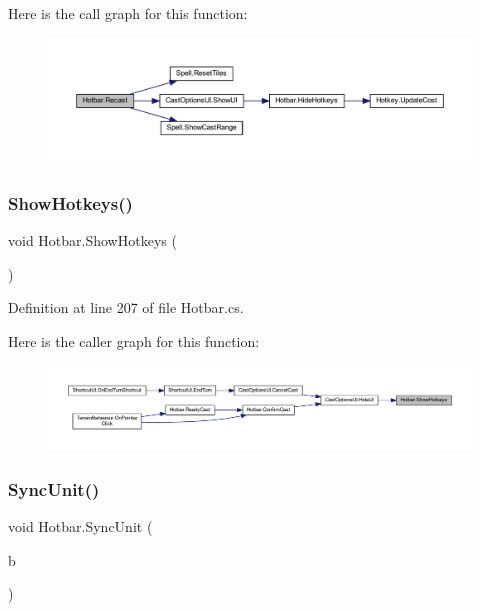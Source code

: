 Here is the call graph for this function\+:
\nopagebreak
\begin{figure}[H]
\begin{center}
\leavevmode
\includegraphics[width=350pt]{class_hotbar_acda305961d329d3b329dbe4247539ef5_cgraph}
\end{center}
\end{figure}
\mbox{\label{class_hotbar_a989b6728a8d86d60a851f68954edab90}} 
\subsubsection{\texorpdfstring{ShowHotkeys()}{ShowHotkeys()}}
{\footnotesize\ttfamily void Hotbar.\+Show\+Hotkeys (\begin{DoxyParamCaption}{ }\end{DoxyParamCaption})}



Definition at line 207 of file Hotbar.\+cs.

Here is the caller graph for this function\+:
\nopagebreak
\begin{figure}[H]
\begin{center}
\leavevmode
\includegraphics[width=350pt]{class_hotbar_a989b6728a8d86d60a851f68954edab90_icgraph}
\end{center}
\end{figure}
\mbox{\label{class_hotbar_a1e796a0a133ee0743aa8585c05980f9b}} 
\subsubsection{\texorpdfstring{SyncUnit()}{SyncUnit()}}
{\footnotesize\ttfamily void Hotbar.\+Sync\+Unit (\begin{DoxyParamCaption}\item[{\mbox{\hyperlink{class_base_unit}{Base\+Unit}}}]{b }\end{DoxyParamCaption})}



